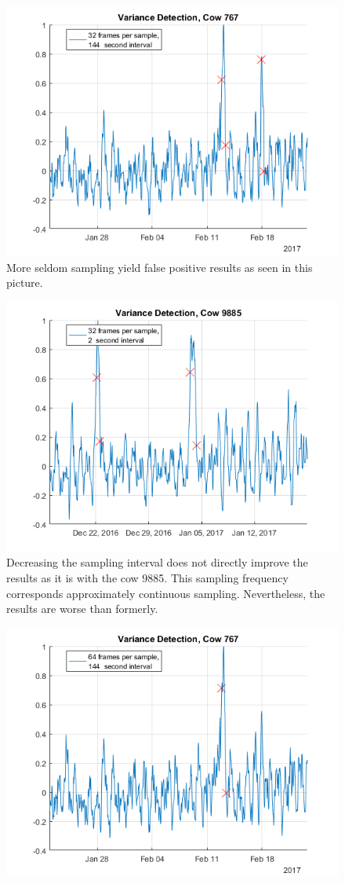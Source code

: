 \documentclass[english,12pt,a4paper,pdftex,elec,utf8]{aaltothesis}
\begin{document}
\begin{figure}[htb]
\centering
\includegraphics[width = 0.75 \textwidth]{figures/VarianceDetectionCow767_32frames144seconds.png}
\caption{More seldom sampling yield false positive results as seen in this picture.}
\label{}
\end{figure}


\begin{figure}[htb]
\centering
\includegraphics[width = 0.75 \textwidth]{figures/VarianceDetectionCow9885_32frames2seconds.png}
\caption{Decreasing the sampling interval does not directly improve the results as it is with the cow 9885. This sampling frequency corresponds approximately continuous sampling. Nevertheless, the results are worse than formerly.}
\label{}
\end{figure}



\begin{figure}[htb]
\centering
\includegraphics[width = 0.75 \textwidth]{figures/VarianceDetectionCow767_64frames144seconds.png}
\caption{}
\label{}
\end{figure}
\end{document}
